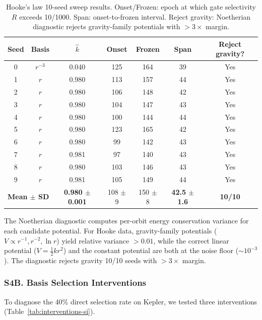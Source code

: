\documentclass[9pt,twocolumn,twoside]{pnas-new}
\begin{document}
\begin{table}[!ht]
\centering
\caption{Hooke's law 10-seed sweep results. Onset/Frozen: epoch at which gate selectivity $R$ exceeds 10/1000. Span: onset-to-frozen interval. Reject gravity: Noetherian diagnostic rejects gravity-family potentials with $>3\times$ margin.}
\label{tab:hooke-si}
\footnotesize
\begin{tabular}{ccccccc}
\hline
Seed & Basis & $\hat{k}$ & Onset & Frozen & Span & Reject gravity? \\
\hline
0 & $r^{-3}$ & 0.040 & 125 & 164 & 39 & Yes \\
1 & $r$ & 0.980 & 113 & 157 & 44 & Yes \\
2 & $r$ & 0.980 & 106 & 148 & 42 & Yes \\
3 & $r$ & 0.980 & 104 & 147 & 43 & Yes \\
4 & $r$ & 0.980 & 100 & 144 & 44 & Yes \\
5 & $r$ & 0.980 & 123 & 165 & 42 & Yes \\
6 & $r$ & 0.980 & 99 & 142 & 43 & Yes \\
7 & $r$ & 0.981 & 97 & 140 & 43 & Yes \\
8 & $r$ & 0.980 & 103 & 146 & 43 & Yes \\
9 & $r$ & 0.981 & 105 & 149 & 44 & Yes \\
\hline
\multicolumn{2}{l}{\textbf{Mean $\pm$ SD}} & \textbf{0.980 $\pm$ 0.001} & 108 $\pm$ 9 & 150 $\pm$ 8 & \textbf{42.5 $\pm$ 1.6} & \textbf{10/10} \\
\hline
\end{tabular}
\end{table}

The Noetherian diagnostic computes per-orbit energy conservation variance for each candidate potential. For Hooke data, gravity-family potentials ($V \propto r^{-1}, r^{-2}, \ln r$) yield relative variance $>0.01$, while the correct linear potential ($V = \frac{1}{2}kr^2$) and the constant potential are both at the noise floor ($\sim 10^{-3}$). The diagnostic rejects gravity 10/10 seeds with $>3\times$ margin.

\subsubsection*{S4B. Basis Selection Interventions}
To diagnose the 40\% direct selection rate on Kepler, we tested three interventions (Table~\ref{tab:interventions-si}).
\end{document}
